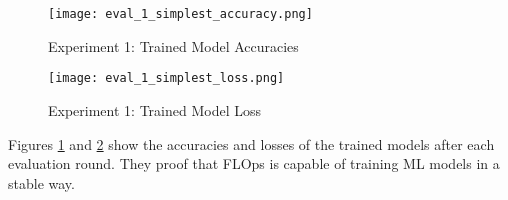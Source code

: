 \begin{figure}[h]
    \centering
    \texttt{[image: eval\_1\_simplest\_accuracy.png]}
    \caption{Experiment 1: Trained Model Accuracies}
    \label{fig:eval_1_simplest_accuracies}
\end{figure}

\begin{figure}[h]
    \centering
    \texttt{[image: eval\_1\_simplest\_loss.png]}
    \caption{Experiment 1: Trained Model Loss}
    \label{fig:eval_1_simplest_loss}
\end{figure}

Figures \ref{fig:eval_1_simplest_accuracies} and \ref{fig:eval_1_simplest_loss} show the accuracies and losses of the trained models after each evaluation round.
They proof that FLOps is capable of training ML models in a stable way.